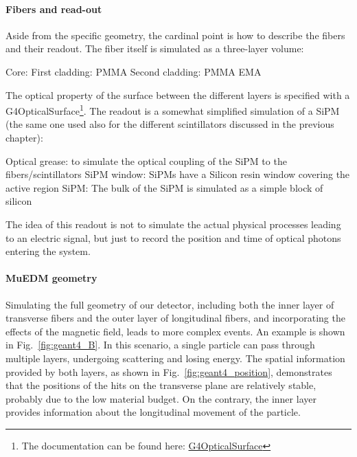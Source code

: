 \begin{refsection}
        \paragraph{Fibers and read-out} Aside from the specific geometry, the cardinal point is how to describe the fibers and their readout. 
        The fiber itself is simulated as a three-layer volume:
        \begin{outline}
            \1 Core: 
            \1 First cladding: PMMA
            \1 Second cladding: PMMA EMA
        \end{outline}
        The optical property of the surface between the different layers is specified with a G4OpticalSurface\footnote{The documentation can be found here: \href{https://apc.u-paris.fr/~franco/g4doxy/html/classG4OpticalSurface.html}{G4OpticalSurface}}.
        The readout is a somewhat simplified simulation of a SiPM (the same one used also for the different scintillators discussed in the previous chapter):
        \begin{outline}
            \1 Optical grease: to simulate the optical coupling of the SiPM to the fibers/scintillators
            \1 SiPM window: SiPMs have a Silicon resin window covering the active region
            \1 SiPM: The bulk of the SiPM is simulated as a simple block of silicon
        \end{outline}
        The idea of this readout is not to simulate the actual physical processes leading to an electric signal, but just to record the position and time of optical photons entering the system.


        \vspace{2mm}
        \paragraph{MuEDM geometry}
        Simulating the full geometry of our detector, including both the inner layer of transverse fibers and the outer layer of longitudinal fibers, and incorporating the effects of the magnetic field, leads to more complex events. An example is shown in Fig.~\ref{fig:geant4_B}. In this scenario, a single particle can pass through multiple layers, undergoing scattering and losing energy. The spatial information provided by both layers, as shown in Fig.~\ref{fig:geant4_position}, demonstrates that the positions of the hits on the transverse plane are relatively stable, probably due to the low material budget. On the contrary, the inner layer provides information about the longitudinal movement of the particle.


\end{refsection}
